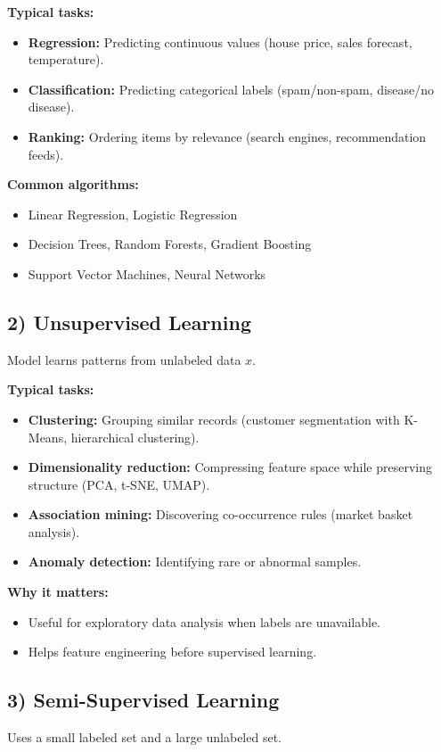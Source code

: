 \documentclass[12pt,a4paper]{article}
\begin{document}
\textbf{Typical tasks:}
\begin{itemize}[noitemsep]
    \item \textbf{Regression:} Predicting continuous values (house price, sales forecast, temperature).
    \item \textbf{Classification:} Predicting categorical labels (spam/non-spam, disease/no disease).
    \item \textbf{Ranking:} Ordering items by relevance (search engines, recommendation feeds).
\end{itemize}

\textbf{Common algorithms:}
\begin{itemize}[noitemsep]
    \item Linear Regression, Logistic Regression
    \item Decision Trees, Random Forests, Gradient Boosting
    \item Support Vector Machines, Neural Networks
\end{itemize}

\subsection*{2) Unsupervised Learning}
Model learns patterns from unlabeled data $x$.

\textbf{Typical tasks:}
\begin{itemize}[noitemsep]
    \item \textbf{Clustering:} Grouping similar records (customer segmentation with K-Means, hierarchical clustering).
    \item \textbf{Dimensionality reduction:} Compressing feature space while preserving structure (PCA, t-SNE, UMAP).
    \item \textbf{Association mining:} Discovering co-occurrence rules (market basket analysis).
    \item \textbf{Anomaly detection:} Identifying rare or abnormal samples.
\end{itemize}

\textbf{Why it matters:}
\begin{itemize}[noitemsep]
    \item Useful for exploratory data analysis when labels are unavailable.
    \item Helps feature engineering before supervised learning.
\end{itemize}

\subsection*{3) Semi-Supervised Learning}
Uses a small labeled set and a large unlabeled set.
\end{document}
